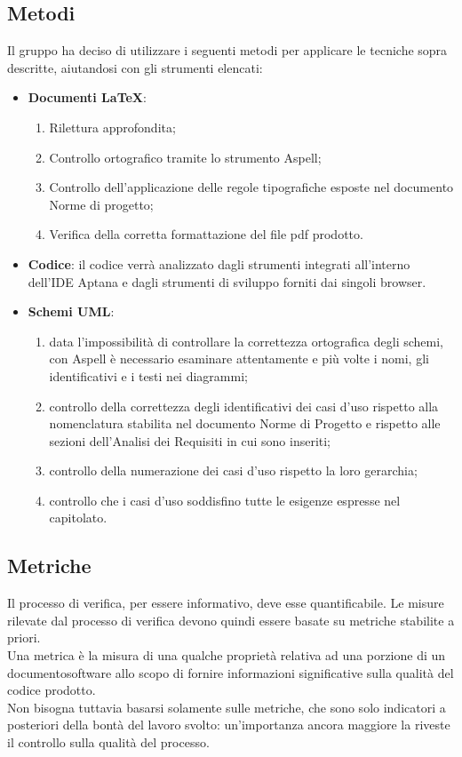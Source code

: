 \subsection{Metodi}
\label{sec:Metodi}
Il gruppo ha deciso di utilizzare i seguenti metodi per applicare le tecniche sopra descritte, aiutandosi con gli strumenti elencati:
\begin{itemize}
\item \textbf{Documenti \LaTeX}:
\begin{enumerate}
	\item Rilettura approfondita;
	\item Controllo ortografico tramite lo strumento Aspell;
	\item Controllo dell'applicazione delle regole tipografiche esposte nel documento Norme di progetto;
	\item Verifica della corretta formattazione del file pdf prodotto.
\end{enumerate}

\item \textbf{Codice}: il codice verrà analizzato dagli strumenti integrati all'interno dell'IDE Aptana e dagli strumenti di sviluppo forniti dai singoli browser.

\item \textbf{Schemi UML}:
\begin{enumerate}
	\item data l'impossibilità di controllare la correttezza ortografica degli schemi, con Aspell è necessario esaminare attentamente e più volte i nomi, gli identificativi e i testi nei diagrammi;
	\item controllo della correttezza degli identificativi dei casi d'uso rispetto alla nomenclatura stabilita nel documento Norme di Progetto e rispetto alle sezioni dell'Analisi dei Requisiti in cui sono inseriti;
	\item controllo della numerazione dei casi d'uso rispetto la loro gerarchia;
	\item controllo che i casi d'uso soddisfino tutte le esigenze espresse nel capitolato.
\end{enumerate}
\end{itemize}
\subsection{Metriche}
Il processo di verifica, per essere informativo, deve esse quantificabile. Le misure rilevate dal processo di verifica devono quindi essere basate su metriche stabilite a priori. \\
Una metrica è la misura di una qualche proprietà relativa ad una porzione di un documentosoftware allo scopo di fornire informazioni significative sulla qualità del codice prodotto. \\
Non bisogna tuttavia basarsi solamente sulle metriche, che sono solo indicatori a posteriori della bontà del lavoro svolto: un'importanza ancora maggiore la riveste il controllo sulla qualità del processo.
